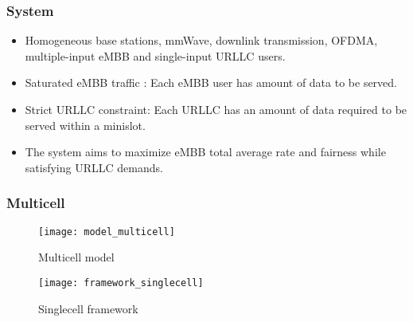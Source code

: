 \begin{frame}
  \frametitle{System}
  \begin{itemize}
    \item Homogeneous base stations, mmWave, downlink transmission, OFDMA, multiple-input eMBB and single-input URLLC users.
    \item Saturated eMBB traffic \cite{S05}: Each eMBB user has  amount of data to be served.
    \item Strict URLLC constraint: Each URLLC has an amount of data required to be served within a minislot.
    \item The system aims to maximize eMBB total average rate and fairness while satisfying URLLC demands.
  \end{itemize}
\end{frame}

\begin{frame}
  \frametitle{Multicell}
  \begin{figure}
    \texttt{[image: model\_multicell]}
    \caption{Multicell model}
  \end{figure}
\end{frame}

\begin{frame}
  \begin{figure}
    \texttt{[image: framework\_singlecell]}
    \caption{Singlecell framework}
  \end{figure}
\end{frame}
